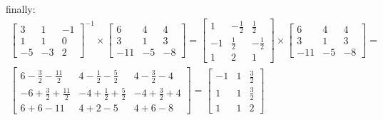 \documentclass[11pt]{article}
\begin{document}
finally:
\begin{align*}
  \begin{bmatrix}
    3  & 1  & -1 \\
    1  & 1  & 0 \\
    -5 & -3 & 2
  \end{bmatrix}^{-1} \times
  \begin{bmatrix}
    6   & 4  & 4 \\
    3   & 1  & 3 \\
    -11 & -5 & -8
  \end{bmatrix} = 
  \begin{bmatrix}
    1  & -\frac{1}{2} & \frac{1}{2} \\
    -1 & \frac{1}{2}  & -\frac{1}{2} \\
    1  & 2            & 1
  \end{bmatrix} \times
  \begin{bmatrix}
    6   & 4  & 4 \\
    3   & 1  & 3 \\
    -11 & -5 & -8
  \end{bmatrix} = \\
  \begin{bmatrix}
    6 - \frac{3}{2} - \frac{11}{2}  & 4 - \frac{1}{2} - \frac{5}{2}  & 4 - \frac{3}{2} - 4 \\
    -6 + \frac{3}{2} + \frac{11}{2} & -4 + \frac{1}{2} + \frac{5}{2} & -4 + \frac{3}{2} + 4 \\
    6 + 6 - 11                      & 4 + 2 - 5                      & 4 + 6 - 8
  \end{bmatrix} = 
  \begin{bmatrix}
    -1 & 1 & \frac{3}{2} \\
    1  & 1 & \frac{3}{2} \\
    1  & 1 & 2
  \end{bmatrix}
\end{align*}
\end{document}
